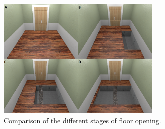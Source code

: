 \begin{figure}[ht]
\centering
\includegraphics[width=0.7\textwidth]{images/OpenComparison.png}
\caption{Comparison of the different stages of floor opening.}
\label{OpenImg}
\end{figure}


